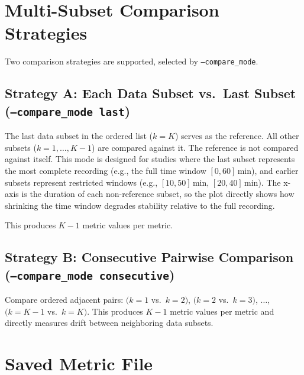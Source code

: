 \documentclass[11pt]{article}
\begin{document}
\section{Multi-Subset Comparison Strategies}
\label{sec:strategies}

Two comparison strategies are supported, selected by \texttt{--compare\_mode}.

\subsection*{Strategy A: Each Data Subset vs.\ Last Subset (\texttt{--compare\_mode last})}

The last data subset in the ordered list ($k = K$) serves as the reference. All other subsets ($k = 1, \dots, K-1$) are compared against it. The reference is not compared against itself. This mode is designed for studies where the last subset represents the most complete recording (e.g., the full time window $[0, 60]$\,min), and earlier subsets represent restricted windows (e.g., $[10, 50]$\,min, $[20, 40]$\,min). The x-axis is the duration of each non-reference subset, so the plot directly shows how shrinking the time window degrades stability relative to the full recording.

This produces $K-1$ metric values per metric.

\subsection*{Strategy B: Consecutive Pairwise Comparison (\texttt{--compare\_mode consecutive})}

Compare ordered adjacent pairs: $(k=1$ vs.\ $k=2)$, $(k=2$ vs.\ $k=3)$, $\ldots$, $(k=K-1$ vs.\ $k=K)$. This produces $K-1$ metric values per metric and directly measures drift between neighboring data subsets.

\section{Saved Metric File}
\label{sec:output}
\end{document}
